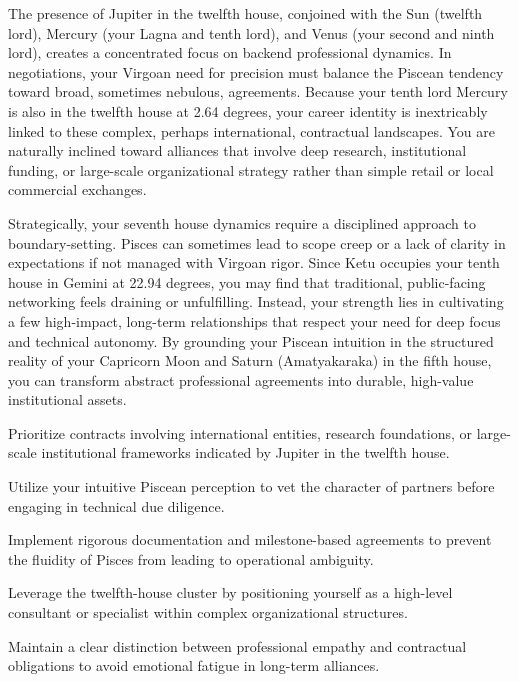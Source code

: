 {\fontsize{9}{13}\selectfont The presence of Jupiter in the twelfth house, conjoined with the Sun (twelfth lord), Mercury (your Lagna and tenth lord), and Venus (your second and ninth lord), creates a concentrated focus on backend professional dynamics. In negotiations, your Virgoan need for precision must balance the Piscean tendency toward broad, sometimes nebulous, agreements. Because your tenth lord Mercury is also in the twelfth house at 2.64 degrees, your career identity is inextricably linked to these complex, perhaps international, contractual landscapes. You are naturally inclined toward alliances that involve deep research, institutional funding, or large-scale organizational strategy rather than simple retail or local commercial exchanges.}\par\vspace{1.8mm}

{\fontsize{9}{13}\selectfont Strategically, your seventh house dynamics require a disciplined approach to boundary-setting. Pisces can sometimes lead to scope creep or a lack of clarity in expectations if not managed with Virgoan rigor. Since Ketu occupies your tenth house in Gemini at 22.94 degrees, you may find that traditional, public-facing networking feels draining or unfulfilling. Instead, your strength lies in cultivating a few high-impact, long-term relationships that respect your need for deep focus and technical autonomy. By grounding your Piscean intuition in the structured reality of your Capricorn Moon and Saturn (Amatyakaraka) in the fifth house, you can transform abstract professional agreements into durable, high-value institutional assets.}\par\vspace{1.8mm}

\begin{diamondlist}
  \item {\fontsize{8.5}{12}\selectfont Prioritize contracts involving international entities, research foundations, or large-scale institutional frameworks indicated by Jupiter in the twelfth house.}
  \item {\fontsize{8.5}{12}\selectfont Utilize your intuitive Piscean perception to vet the character of partners before engaging in technical due diligence.}
  \item {\fontsize{8.5}{12}\selectfont Implement rigorous documentation and milestone-based agreements to prevent the fluidity of Pisces from leading to operational ambiguity.}
  \item {\fontsize{8.5}{12}\selectfont Leverage the twelfth-house cluster by positioning yourself as a high-level consultant or specialist within complex organizational structures.}
  \item {\fontsize{8.5}{12}\selectfont Maintain a clear distinction between professional empathy and contractual obligations to avoid emotional fatigue in long-term alliances.}
\end{diamondlist}

